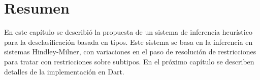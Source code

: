 \section*{Resumen}
En este capítulo se describió la propuesta de un sistema de inferencia heurístico para la desclasificación basada en tipos. Este sistema se basa en la inferencia en sistemas Hindley-Milner, con variaciones en el paso de resolución de restricciones para tratar con restricciones sobre subtipos. En el próximo capítulo se describen detalles de la implementación en Dart.
